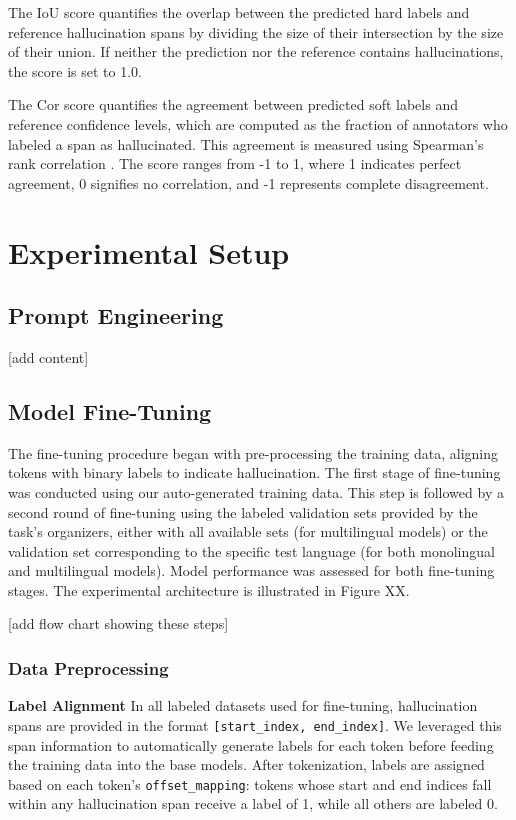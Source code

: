 \documentclass[11pt]{article}
\begin{document}
The IoU score quantifies the overlap between the predicted hard labels and reference hallucination spans by dividing the size of their intersection by the size of their union. If neither the prediction nor the reference contains hallucinations, the score is set to 1.0.

The Cor score quantifies the agreement between predicted soft labels and reference confidence levels, which are computed as the fraction of annotators who labeled a span as hallucinated. This agreement is measured using Spearman’s rank correlation \cite{spearman1987proof}. The score ranges from -1 to 1, where 1 indicates perfect agreement, 0 signifies no correlation, and -1 represents complete disagreement.



\section{Experimental Setup}
\subsection{Prompt Engineering}
[add content]

\subsection{Model Fine-Tuning}
The fine-tuning procedure began with pre-processing the training data, aligning tokens with binary labels to indicate hallucination. The first stage of fine-tuning was conducted using our auto-generated training data. This step is followed by a second round of fine-tuning using the labeled validation sets provided by the task's organizers, either with all available sets (for multilingual models) or the validation set corresponding to the specific test language (for both monolingual and multilingual models).
Model performance was assessed for both fine-tuning stages. The experimental architecture is illustrated in Figure XX.

[add flow chart showing these steps]

\subsubsection{Data Preprocessing}
\textbf{Label Alignment}  
\label{sec:Label-Alignment}
In all labeled datasets used for fine-tuning, hallucination spans are provided in the format \texttt{[start\_index, end\_index]}. We leveraged this span information to automatically generate labels for each token before feeding the training data into the base models. After tokenization, labels are assigned based on each token’s \texttt{offset\_mapping}: tokens whose start and end indices fall within any hallucination span receive a label of 1, while all others are labeled 0.
\end{document}
